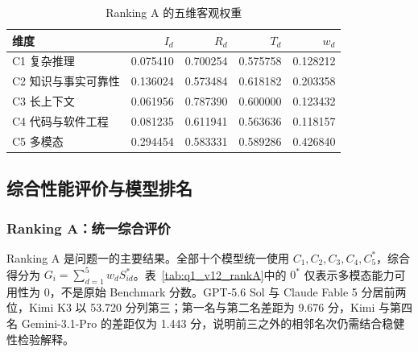 \begin{table}[htbp]
\centering
\caption{Ranking A 的五维客观权重}
\label{tab:q1_v12_weights}
\begin{tabular}{lrrrr}
\toprule
维度 & $I_d$ & $R_d$ & $T_d$ & $w_d$\\
\midrule
C1 复杂推理 & 0.075410 & 0.700254 & 0.575758 & 0.128212\\
C2 知识与事实可靠性 & 0.136024 & 0.573484 & 0.618182 & 0.203358\\
C3 长上下文 & 0.061956 & 0.787390 & 0.600000 & 0.123432\\
C4 代码与软件工程 & 0.081235 & 0.611941 & 0.563636 & 0.118157\\
C5 多模态 & 0.294454 & 0.583331 & 0.589286 & 0.426840\\
\bottomrule
\end{tabular}
\end{table}

\subsection{综合性能评价与模型排名}
\subsubsection{Ranking A：统一综合评价}
Ranking A 是问题一的主要结果。全部十个模型统一使用 $C_1,C_2,C_3,C_4,C_5^{*}$，综合得分为 $G_i=\sum_{d=1}^{5}w_dS_{id}^{*}$。表~\ref{tab:q1_v12_rankA}中的 $0^*$ 仅表示多模态能力可用性为 0，不是原始 Benchmark 分数。GPT-5.6 Sol 与 Claude Fable 5 分居前两位，Kimi K3 以 53.720 分列第三；第一名与第二名差距为 9.676 分，Kimi 与第四名 Gemini-3.1-Pro 的差距仅为 1.443 分，说明前三之外的相邻名次仍需结合稳健性检验解释。

